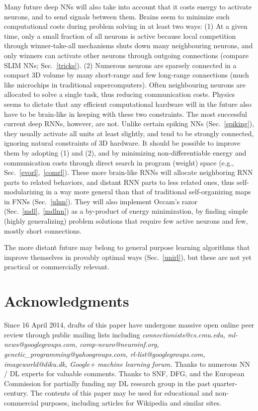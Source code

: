 \documentclass[letterpaper]{article}
\begin{document}
\begin{sloppypar}
Many future deep NNs will also take into account that it costs energy
to activate neurons, and to send signals between them. Brains seem to
minimize such computational costs during problem solving in at least
two ways: (1) At a given time, only a small fraction of all neurons is
active because local competition through winner-take-all mechanisms
shuts down many neighbouring neurons, and only winners can activate
other neurons through outgoing connections (compare SLIM NNs;
Sec.~\ref{tricks}). (2) Numerous neurons are sparsely connected in a
compact 3D volume by many short-range and few long-range connections
(much like microchips in traditional supercomputers). Often
neighbouring neurons are allocated to solve a single task, thus
reducing communication costs.  Physics seems to dictate that any
efficient computational hardware will in the future also have to be
brain-like in keeping with these two constraints. The most successful
current deep RNNs, however, are not. Unlike certain spiking NNs
(Sec.~\ref{spiking}), they usually activate all units at least slightly,
and tend to be strongly connected, ignoring natural constraints of 3D
hardware. It should be possible to improve them by adopting (1) and
(2), and by minimizing non-differentiable energy and communication
costs through direct search in program (weight) space (e.g.,
Sec.~\ref{evorl},~\ref{comrl}).  These more brain-like RNNs will
allocate neighboring RNN parts to related behaviors, and distant RNN
parts to less related ones, thus self-modularizing in a way more
general than that of traditional self-organizing maps in FNNs
(Sec.~\ref{ulnn}). They will also implement Occam's razor
(Sec.~\ref{mdl},~\ref{mdlnn}) as a by-product of energy minimization,
by finding simple (highly generalizing) problem solutions that require
few active neurons and few, mostly short connections.

The more distant future may belong to general purpose learning
algorithms that improve themselves in provably optimal ways
(Sec.~\ref{unirl}), but these are not yet practical or commercially
relevant.
 



\section{Acknowledgments}
\label{ack}


Since 16 April 2014, drafts of this paper have undergone massive open online peer review through public mailing lists including 
{\em connectionists\-@cs.cmu.edu, ml-news\-@googlegroups.com, comp-neuro\-@neuro\-inf.org, genetic\_pro\-gramming\-@yahoo\-groups.com, rl-list\-@googlegroups.com, image\-world\-@diku.dk, Google+ machine learning forum.} 
Thanks to numerous NN / DL experts for valuable comments. Thanks to SNF, DFG, and the European Commission for partially funding my DL research group in the past quarter-century.
The contents of this paper may be used for educational and non-commercial purposes, including articles for Wikipedia and similar sites.

\end{sloppypar}



%
%
%
%
%
\end{document}

